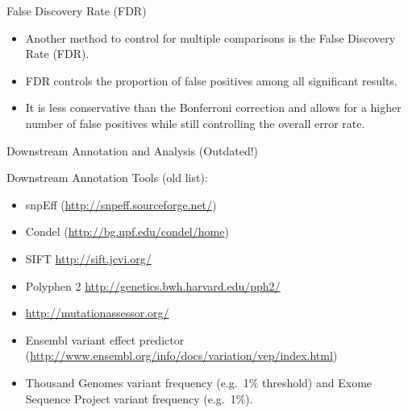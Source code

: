 \documentclass[
  ignorenonframetext,
]{beamer}
\providecommand{\tightlist}{%
  \setlength{\itemsep}{0pt}\setlength{\parskip}{0pt}}
\begin{document}
\begin{frame}{False Discovery Rate (FDR)}
\label{false-discovery-rate-fdr}
\Large

\begin{itemize}
\tightlist
\item
  Another method to control for multiple comparisons is the False
  Discovery Rate (FDR).
\item
  FDR controls the proportion of false positives among all significant
  results.
\item
  It is less conservative than the Bonferroni correction and allows for
  a higher number of false positives while still controlling the overall
  error rate.
\end{itemize}
\end{frame}

\begin{frame}{Downstream Annotation and Analysis (Outdated!)}
\label{downstream-annotation-and-analysis-outdated}
\large

Downstream Annotation Tools (old list):

\begin{itemize}
\tightlist
\item
  snpEff (\url{http://snpeff.sourceforge.net/})
\item
  Condel (\url{http://bg.upf.edu/condel/home})
\item
  SIFT \url{http://sift.jcvi.org/}
\item
  Polyphen 2 \url{http://genetics.bwh.harvard.edu/pph2/}
\item
  \url{http://mutationassessor.org/}
\item
  Ensembl variant effect predictor
  (\url{http://www.ensembl.org/info/docs/variation/vep/index.html})
\item
  Thousand Genomes variant frequency (e.g.~1\% threshold) and Exome
  Sequence Project variant frequency (e.g.~1\%).
\end{itemize}
\end{frame}
\end{document}
